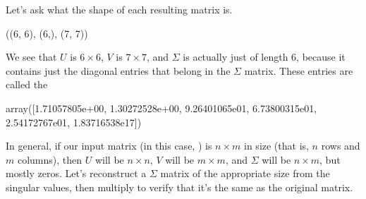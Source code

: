 \documentclass[letterpaper,10pt,english]{sphinxmanual}
\begin{document}
Let’s ask what the shape of each resulting matrix is.

\begin{sphinxVerbatim}[commandchars=\\\{\}]
  
\end{sphinxVerbatim}

\begin{sphinxVerbatim}[commandchars=\\\{\}]
((6, 6), (6,), (7, 7))
\end{sphinxVerbatim}

We see that \(U\) is \(6\times6\), \(V\) is \(7\times 7\), and \(\Sigma\) is actually just of length 6, because it contains just the diagonal entries that belong in the \(\Sigma\) matrix.  These entries are called the 

\begin{sphinxVerbatim}[commandchars=\\\{\}]
\end{sphinxVerbatim}

\begin{sphinxVerbatim}[commandchars=\\\{\}]
array([1.71057805e+00, 1.30272528e+00, 9.26401065e\PYGZhy{}01, 6.73800315e\PYGZhy{}01,
       2.54172767e\PYGZhy{}01, 1.83716538e\PYGZhy{}17])
\end{sphinxVerbatim}

In general, if our input matrix (in this case, ) is \(n\times m\) in size (that is, \(n\) rows and \(m\) columns), then \(U\) will be \(n\times n\), \(V\) will be \(m\times m\), and \(\Sigma\) will be \(n\times m\), but mostly zeros.  Let’s reconstruct a \(\Sigma\) matrix of the appropriate size from the singular values, then multiply  to verify that it’s the same as the original  matrix.

\begin{sphinxVerbatim}[commandchars=\\\{\}]
     
   
     
\end{sphinxVerbatim}
\end{document}
